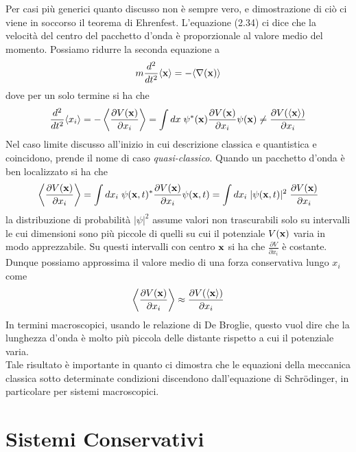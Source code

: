 \noindent Per casi pi\`u generici quanto discusso non \`e sempre vero, e dimostrazione di ci\`o ci viene in soccorso il teorema di Ehrenfest. L'equazione (2.34) ci dice che la velocit\`a del centro del pacchetto d'onda \`e proporzionale al valore medio del momento.  Possiamo ridurre la seconda equazione a 
\begin{equation*}
	m\frac{d^2}{dt^2}\langle \bold{x} \rangle =- \langle \nabla(\bold{x}) \rangle 
\end{equation*}  
dove per un solo termine si ha che 
\begin{equation*}
	\frac{d^2}{dt^2}\langle x_i \rangle = - \left \langle \frac{\partial V(\bold{x})}{\partial x_i} \right \rangle = \int dx\; \psi^*(\bold{x}) \frac{\partial V(\bold{x})}{\partial x_i}\psi(\bold{x}) \neq \frac{\partial V(\langle \bold{x}\rangle)}{\partial x_i} 
\end{equation*}
Nel caso limite discusso all'inizio in cui descrizione classica e quantistica e coincidono, prende il nome di caso \textit{quasi-classico}. Quando un pacchetto d'onda \`e ben localizzato si ha che 
\begin{equation*}
	\left \langle \frac{\partial V(\bold{x})}{\partial x_i} \right \rangle = \int dx_i \; \psi(\bold{x},t)^* \frac{\partial V(\bold{x})}{\partial x_i} \psi(\bold{x},t) = \int dx_i \; |\psi(\bold{x},t)|^2 \; \frac{\partial V(\bold{x})}{\partial x_i}
\end{equation*}
la distribuzione di probabilit\`a $|\psi|^2$ assume valori non trascurabili solo su intervalli le cui dimensioni sono pi\`u piccole di quelli su cui il potenziale $V(\bold{x})$ varia in modo apprezzabile. Su questi intervalli con centro $\bold{x}$ si ha che $\frac{\partial V}{\partial x_i}$ \`e costante. Dunque possiamo approssima il valore medio di una forza conservativa lungo $x_i$ come
\begin{equation*}
	\left \langle \frac{\partial V(\bold{x})}{\partial x_i} \right \rangle \approx \frac{\partial V(\langle \bold{x} \rangle)}{\partial x_i}
\end{equation*}
In termini macroscopici, usando le relazione di De Broglie, questo vuol dire che la lunghezza d'onda \`e molto pi\`u piccola  delle distante rispetto a cui il potenziale varia.
\\
Tale risultato \`e importante in quanto ci dimostra che le equazioni della meccanica classica sotto determinate condizioni discendono dall'equazione di Schr\"odinger, in particolare per sistemi macroscopici.

\section{Sistemi Conservativi}


